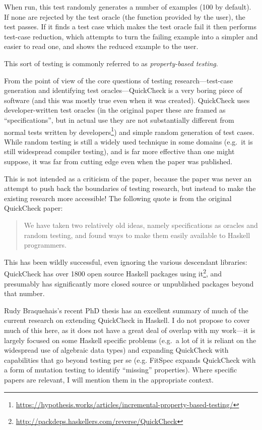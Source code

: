 When run, this test randomly generates a number of examples (100 by default).
If none are rejected by the test oracle (the function provided by the user),
the test passes.
If it finds a test case which makes the test oracle fail it then performs test-case reduction\cite{DBLP:conf/issta/HildebrandtZ00, DBLP:conf/pldi/RegehrCCEEY12},
which attempts to turn the failing example into a simpler and easier to read one,
and shows the reduced example to the user.

This sort of testing is commonly referred to as \emph{property-based testing}\cite{DBLP:conf/erlang/ArtsHJW06}.

From the point of view of the core questions of testing research---test-case generation and identifying test oracles---QuickCheck
is a very boring piece of software (and this was mostly true even when it was created).
QuickCheck uses developer-written test oracles (in the original paper these are framed as ``specifications'',
but in actual use they are not substantially different from normal tests written by developers\footnote{\url{https://hypothesis.works/articles/incremental-property-based-testing/}}) and simple random generation of test cases.
While random testing is still a widely used technique in some domains
(e.g.\ it is still widespread compiler testing),
and is far more effective than one might suppose\cite{DBLP:journals/tse/HamletT90, DBLP:journals/pacmpl/MajumdarN18},
it was far from cutting edge even when the paper was published.

This is not intended as a criticism of the paper,
because the paper was never an attempt to push back the boundaries of testing research,
but instead to make the existing research more accessible!
The following quote is from the original QuickCheck paper\cite{DBLP:conf/icfp/ClaessenH00}:

\begin{quote}
We have taken two relatively old ideas, namely specifications
as oracles and random testing, and found ways to make
them easily available to Haskell programmers.
\end{quote}

This has been wildly successful,
even ignoring the various descendant libraries:
QuickCheck has over 1800 open source Haskell packages using it\footnote{\url{http://packdeps.haskellers.com/reverse/QuickCheck}},
and presumably has significantly more closed source or unpublished packages beyond that number.

Rudy Braquehais's recent PhD thesis\cite{matela2017tools} has an excellent summary of much of the current research on extending QuickCheck in Haskell.
I do not propose to cover much of this here,
as it does not have a great deal of overlap with my work---it
is largely focused on some Haskell specific problems (e.g.\ a lot of it is reliant on the widespread use of algebraic data types) and expanding QuickCheck with capabilities that go beyond testing per se
(e.g. FitSpec\cite{DBLP:conf/haskell/BraquehaisR16} expands QuickCheck with a form of mutation testing\cite{DBLP:journals/tse/JiaH11} to identify ``missing'' properties).
Where specific papers are relevant,
I will mention them in the appropriate context.

